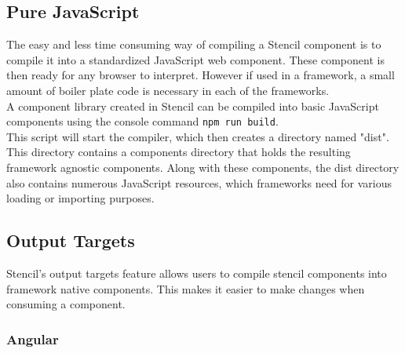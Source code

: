 \subsection{Pure JavaScript}
The easy and less time consuming way of compiling a Stencil component is to compile it into a standardized JavaScript web component. These component is then ready for any browser to interpret. However if used in a framework, a small amount of boiler plate code is necessary in each of the frameworks.\\[0.5cm]
%
A component library created in Stencil can be compiled into basic JavaScript components using the console command \verb+npm run build+.\\
This script will start the compiler, which then creates a directory named "dist". This directory contains a components directory that holds the resulting framework agnostic components. Along with these components, the dist directory also contains numerous JavaScript resources, which frameworks need for various loading or importing purposes.

\subsection{Output Targets}
Stencil's output targets feature allows users to compile stencil components into framework native components. This makes it easier to make changes when consuming a component.
\subsubsection{Angular}

